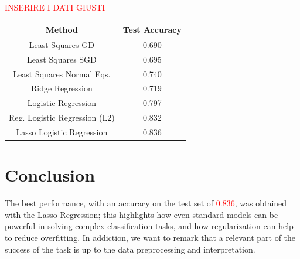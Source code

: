 \documentclass[10pt,conference,compsocconf]{IEEEtran}
\begin{document}
\textcolor{red}{INSERIRE I DATI GIUSTI}
\begin{center}
\label{table1}
\begin{tabular}{|c c|} 
 \hline
 Method & Test Accuracy  \\ [0.5ex] 
 \hline\hline
 Least Squares GD & 0.690   \\ 
 \hline
 Least Squares SGD & 0.695  \\
 \hline
 Least Squares Normal Eqs. & 0.740   \\
 \hline
 Ridge Regression & 0.719   \\ 
 \hline
 Logistic Regression & 0.797   \\
 \hline
 Reg. Logistic Regression (L2) & 0.832   \\
 \hline
 Lasso Logistic Regression & 0.836   \\
 \hline
\end{tabular}
\end{center}



\section{Conclusion}

The best performance, with an accuracy on the test set of \textcolor{red}{0.836}, was obtained with the Lasso Regression; this highlights how even standard models can be powerful in solving complex classification tasks, and how regularization can help to reduce overfitting.
In addiction, we want to remark that a relevant part of the success of the task is up to the data preprocessing and interpretation.
\end{document}
